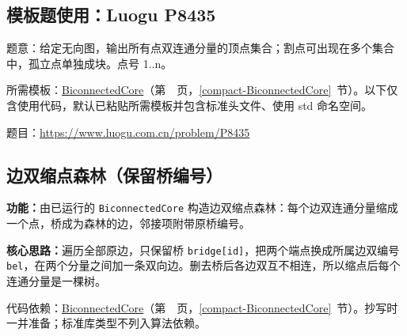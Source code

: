 

\Needspace{385pt}



\Needspace{121pt}



\Needspace{308pt}



\Needspace{410pt}

\subsection*{模板题使用：Luogu P8435}

\label{usage-example-4}

题意：给定无向图，输出所有点双连通分量的顶点集合；割点可出现在多个集合中，孤立点单独成块。点号 1..n。

所需模板：\hyperref[compact-BiconnectedCore]{BiconnectedCore}（第~\pageref{compact-BiconnectedCore}~页，\ref{compact-BiconnectedCore}~节）。以下仅含使用代码，默认已粘贴所需模板并包含标准头文件、使用 std 命名空间。

题目：\url{https://www.luogu.com.cn/problem/P8435}



\Needspace{359pt}

\subsection{边双缩点森林（保留桥编号）}\label{compact-bridge_component_forest}

\noindent\textbf{功能：}\allowbreak 由已运行的 \texttt{BiconnectedCore} 构造边双缩点森林：每个边双连通分量缩成一个点，桥成为森林的边，邻接项附带原桥编号。

\textbf{核心思路：}\allowbreak 遍历全部原边，只保留桥 \texttt{bridge[id]}，把两个端点换成所属边双编号 \texttt{bel}，在两个分量之间加一条双向边。删去桥后各边双互不相连，所以缩点后每个连通分量是一棵树。

代码依赖：\hyperref[compact-BiconnectedCore]{BiconnectedCore}（第~\pageref{compact-BiconnectedCore}~页，\ref{compact-BiconnectedCore}~节）。抄写时一并准备；标准库类型不列入算法依赖。

